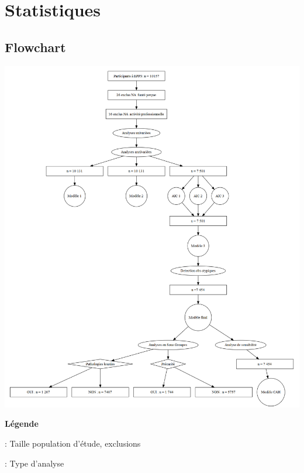 \documentclass{book}
\begin{document}
\newpage
\section{Statistiques}
\subsection{Flowchart}

\begin{center}
\includegraphics[scale=.45]{flowchart.png}
\end{center}
\newpage

\noindent
\textbf{Légende}\\

\bigskip
\noindent
{} : Taille population d'étude, exclusions\\

\noindent
{} : Type d'analyse\\
\end{document}
